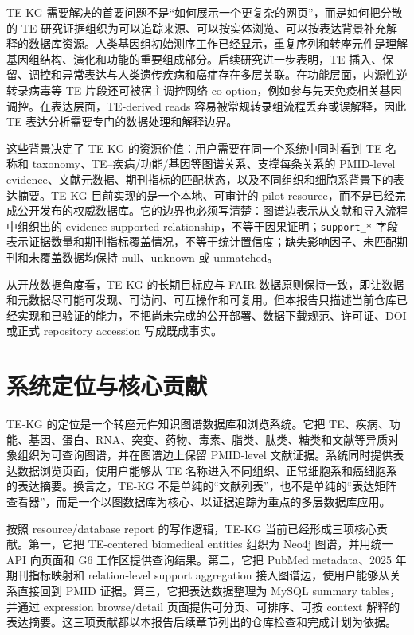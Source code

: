 \documentclass[12pt,a4paper,UTF8]{ctexart}
\newcommand{\code}[1]{\texttt{#1}}
\begin{document}
TE-KG 需要解决的首要问题不是“如何展示一个更复杂的网页”，而是如何把分散的 TE 研究证据组织为可以追踪来源、可以按实体浏览、可以按表达背景补充解释的数据库资源。人类基因组初始测序工作已经显示，重复序列和转座元件是理解基因组结构、演化和功能的重要组成部分\cite{lander_human_genome_2001}。后续研究进一步表明，TE 插入、保留、调控和异常表达与人类遗传疾病和癌症存在多层关联\cite{payer_burns_te_disease_2019,burns_te_cancer_2017}。在功能层面，内源性逆转录病毒等 TE 片段还可被宿主调控网络 co-option，例如参与先天免疫相关基因调控\cite{chuong_erv_immunity_2016}。在表达层面，TE-derived reads 容易被常规转录组流程丢弃或误解释，因此 TE 表达分析需要专门的数据处理和解释边界\cite{lanciano_te_expression_2020}。

这些背景决定了 TE-KG 的资源价值：用户需要在同一个系统中同时看到 TE 名称和 taxonomy、TE--疾病/功能/基因等图谱关系、支撑每条关系的 PMID-level evidence、文献元数据、期刊指标的匹配状态，以及不同组织和细胞系背景下的表达摘要。TE-KG 目前实现的是一个本地、可审计的 pilot resource，而不是已经完成公开发布的权威数据库。它的边界也必须写清楚：图谱边表示从文献和导入流程中组织出的 evidence-supported relationship，不等于因果证明；\code{support\_*} 字段表示证据数量和期刊指标覆盖情况，不等于统计置信度；缺失影响因子、未匹配期刊和未覆盖数据均保持 null、unknown 或 unmatched。

从开放数据角度看，TE-KG 的长期目标应与 FAIR 数据原则保持一致，即让数据和元数据尽可能可发现、可访问、可互操作和可复用\cite{wilkinson_fair_2016}。但本报告只描述当前仓库已经实现和已验证的能力，不把尚未完成的公开部署、数据下载规范、许可证、DOI 或正式 repository accession 写成既成事实。

\section{系统定位与核心贡献}

TE-KG 的定位是一个转座元件知识图谱数据库和浏览系统。它把 TE、疾病、功能、基因、蛋白、RNA、突变、药物、毒素、脂类、肽类、糖类和文献等异质对象组织为可查询图谱，并在图谱边上保留 PMID-level 文献证据。系统同时提供表达数据浏览页面，使用户能够从 TE 名称进入不同组织、正常细胞系和癌细胞系的表达摘要。换言之，TE-KG 不是单纯的“文献列表”，也不是单纯的“表达矩阵查看器”，而是一个以图数据库为核心、以证据追踪为重点的多层数据库应用。

按照 resource/database report 的写作逻辑，TE-KG 当前已经形成三项核心贡献。第一，它把 TE-centered biomedical entities 组织为 Neo4j 图谱，并用统一 API 向页面和 G6 工作区提供查询结果。第二，它把 PubMed metadata、2025 年期刊指标映射和 relation-level support aggregation 接入图谱边，使用户能够从关系直接回到 PMID 证据。第三，它把表达数据整理为 MySQL summary tables，并通过 expression browse/detail 页面提供可分页、可排序、可按 context 解释的表达摘要。这三项贡献都以本报告后续章节列出的仓库检查和完成计划为依据。
\end{document}
